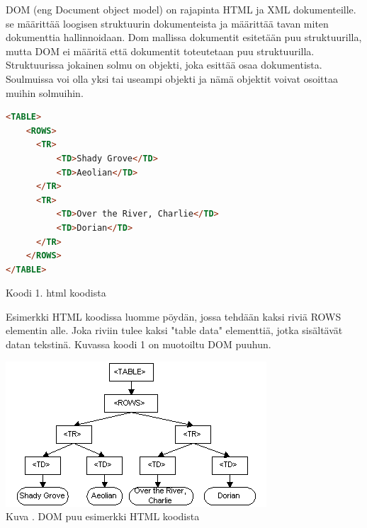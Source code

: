 

DOM (eng Document object model) on rajapinta HTML ja XML dokumenteille. 
se määrittää loogisen struktuurin dokumenteista ja määrittää tavan miten dokumenttia hallinnoidaan.
Dom mallissa dokumentit esitetään puu struktuurilla, mutta DOM ei määritä että dokumentit toteutetaan puu struktuurilla.
Struktuurissa jokainen solmu on objekti, joka esittää osaa dokumentista. 
Soulmuissa voi olla yksi tai useampi objekti ja nämä objektit voivat osoittaa muihin solmuihin.
\bigskip



    
\begin{tcolorbox}
\begin{lstlisting}[language=html]
<TABLE>
    <ROWS> 
      <TR> 
          <TD>Shady Grove</TD>
          <TD>Aeolian</TD> 
      </TR> 
      <TR>
          <TD>Over the River, Charlie</TD>
          <TD>Dorian</TD> 
      </TR> 
    </ROWS>
</TABLE>
\end{lstlisting}
\end{tcolorbox}
Koodi 1. html koodista
\medskip


Esimerkki HTML koodissa luomme pöydän, jossa tehdään kaksi riviä ROWS elementin alle. 
Joka riviin tulee kaksi "table data"{} elementtiä, jotka sisältävät datan tekstinä.
Kuvassa \nextImageCount {} koodi 1 on muotoiltu DOM puuhun.


\bigskip
\includegraphics{./src/public/oppar/dom.png}\\
Kuva \getImgCount {}. DOM puu esimerkki HTML koodista 
\medskip


